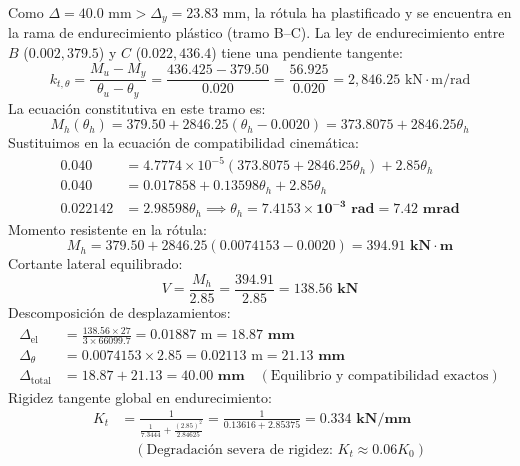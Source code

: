\documentclass[11pt,letterpaper]{article}
\begin{document}
\begin{examplebox}
Como $\Delta = 40.0\text{ mm} > \Delta_y = 23.83\text{ mm}$, la rótula ha plastificado y se encuentra en la rama de endurecimiento plástico (tramo B--C).
La ley de endurecimiento entre $B$ ($0.002, 379.5$) y $C$ ($0.022, 436.4$) tiene una pendiente tangente:
\begin{equation}
k_{t,\theta} = \frac{M_u - M_y}{\theta_u - \theta_y} = \frac{436.425 - 379.50}{0.020} = \frac{56.925}{0.020} = 2,846.25\text{ kN}\cdot\text{m/rad}
\end{equation}
La ecuación constitutiva en este tramo es:
\begin{equation}
M_h(\theta_h) = 379.50 + 2846.25 (\theta_h - 0.0020) = 373.8075 + 2846.25 \theta_h
\end{equation}
Sustituimos en la ecuación de compatibilidad cinemática:
\begin{align}
0.040 &= 4.7774 \times 10^{-5} (373.8075 + 2846.25 \theta_h) + 2.85 \theta_h \nonumber\\
0.040 &= 0.017858 + 0.13598 \theta_h + 2.85 \theta_h \nonumber\\
0.022142 &= 2.98598 \theta_h \implies \theta_h = \mathbf{7.4153 \times 10^{-3}\text{ rad}} = \mathbf{7.42\text{ mrad}}
\end{align}
Momento resistente en la rótula:
\begin{equation}
M_h = 379.50 + 2846.25 (0.0074153 - 0.0020) = \mathbf{394.91\text{ kN}\cdot\text{m}}
\end{equation}
Cortante lateral equilibrado:
\begin{equation}
V = \frac{M_h}{2.85} = \frac{394.91}{2.85} = \mathbf{138.56\text{ kN}}
\end{equation}
Descomposición de desplazamientos:
\begin{align}
\Delta_{\text{el}} &= \frac{138.56 \times 27}{3 \times 66099.7} = 0.01887\text{ m} = \mathbf{18.87\text{ mm}}\\
\Delta_{\theta} &= 0.0074153 \times 2.85 = 0.02113\text{ m} = \mathbf{21.13\text{ mm}}\\
\Delta_{\text{total}} &= 18.87 + 21.13 = \mathbf{40.00\text{ mm}} \quad (\text{Equilibrio y compatibilidad exactos})
\end{align}
Rigidez tangente global en endurecimiento:
\begin{align}
K_t &= \frac{1}{\frac{1}{7.3444} + \frac{(2.85)^2}{2.84625}} = \frac{1}{0.13616 + 2.85375} = \mathbf{0.334\text{ kN/mm}} \nonumber\\
    &\quad (\text{Degradación severa de rigidez: } K_t \approx 0.06 K_0)
\end{align}
\end{examplebox}
\end{document}
